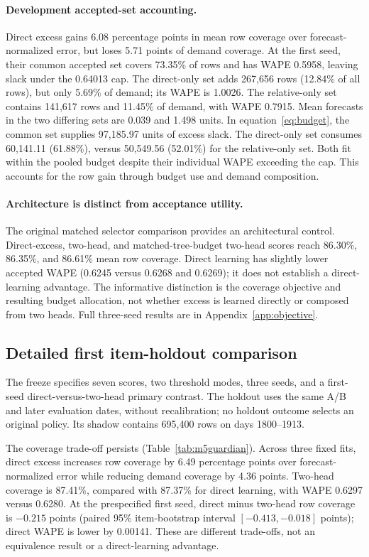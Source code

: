 \paragraph{Development accepted-set accounting.}
Direct excess gains 6.08 percentage points in mean row coverage over forecast-normalized error, but loses 5.71 points of demand coverage. At the first seed, their common accepted set covers 73.35\% of rows and has WAPE 0.5958, leaving slack under the 0.64013 cap. The direct-only set adds 267,656 rows (12.84\% of all rows), but only 5.69\% of demand; its WAPE is 1.0026. The relative-only set contains 141,617 rows and 11.45\% of demand, with WAPE 0.7915. Mean forecasts in the two differing sets are 0.039 and 1.498 units. In equation~\eqref{eq:budget}, the common set supplies 97,185.97 units of excess slack. The direct-only set consumes 60,141.11 (61.88\%), versus 50,549.56 (52.01\%) for the relative-only set. Both fit within the pooled budget despite their individual WAPE exceeding the cap. This accounts for the row gain through budget use and demand composition.


\paragraph{Architecture is distinct from acceptance utility.}
The original matched selector comparison provides an architectural control. Direct-excess, two-head, and matched-tree-budget two-head scores reach 86.30\%, 86.35\%, and 86.61\% mean row coverage. Direct learning has slightly lower accepted WAPE (0.6245 versus 0.6268 and 0.6269); it does not establish a direct-learning advantage. The informative distinction is the coverage objective and resulting budget allocation, not whether excess is learned directly or composed from two heads. Full three-seed results are in Appendix~\ref{app:objective}.

\subsection{Detailed first item-holdout comparison}
\label{app:architecture-holdout}

The freeze specifies seven scores, two threshold modes, three seeds, and a first-seed direct-versus-two-head primary contrast. The holdout uses the same A/B and later evaluation dates, without recalibration; no holdout outcome selects an original policy. Its shadow contains 695,400 rows on days 1800--1913.

The coverage trade-off persists (Table~\ref{tab:m5guardian}). Across three fixed fits, direct excess increases row coverage by 6.49 percentage points over forecast-normalized error while reducing demand coverage by 4.36 points. Two-head coverage is 87.41\%, compared with 87.37\% for direct learning, with WAPE 0.6297 versus 0.6280. At the prespecified first seed, direct minus two-head row coverage is $-0.215$ points (paired 95\% item-bootstrap interval $[-0.413,-0.018]$ points); direct WAPE is lower by 0.00141. These are different trade-offs, not an equivalence result or a direct-learning advantage.



